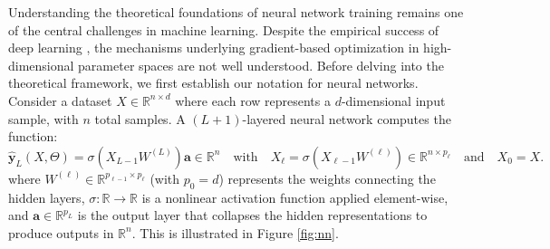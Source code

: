 \documentclass[letterpaper, 10pt, dvipsnames]{article}
\numberwithin{equation}{section}
\newcommand{\Rbb}{\mathbb{R}}
\renewcommand{\hat}{\widehat}
\theoremstyle{definition}
\begin{document}
Understanding the theoretical foundations of neural network training remains one of the central challenges in machine learning. Despite the empirical success of deep learning \cites{imagenet, bert, diffusion}, the mechanisms underlying gradient-based optimization in high-dimensional parameter spaces are not well understood. Before delving into the theoretical framework, we first establish our notation for neural networks. Consider a dataset $X \in \mathbb{R}^{n \times d}$ where each row represents a $d$-dimensional input sample, with $n$ total samples. A $(L+1)$-layered neural network computes the function:
\[
\hat{\mathbf{y}}_L(X,\Theta) 
= 
 \sigma(X_{L-1} W^{(L)})\mathbf{a}\in\Rbb^{n}\quad \text{with} \quad X_\ell = \sigma(X_{\ell-1}W^{(\ell)})\in\Rbb^{n\times p_\ell}\quad\text{and}\quad X_0=X.
\]
where $W^{(\ell)} \in \mathbb{R}^{p_{\ell-1} \times p_\ell}$ (with $p_0=d$) represents the weights connecting the hidden layers, $\sigma: \mathbb{R} \to \mathbb{R}$ is a nonlinear activation function applied element-wise, and $\mathbf{a} \in \mathbb{R}^{p_{L}}$ is the output layer that collapses the hidden representations to produce outputs in $\mathbb{R}^n$. This is illustrated in Figure \ref{fig:nn}.
\end{document}
